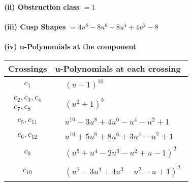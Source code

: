 \documentclass[1p]{elsarticle_modified}
\theoremstyle{definition}
\begin{document}
\flushleft \textbf{(ii) Obstruction class $= 1$}\\~\\
\flushleft \textbf{(iii) Cusp Shapes $= 4 u^8-8 u^6+8 u^4+4 u^2-8$}\\~\\
\newpage\renewcommand{\arraystretch}{1}
\flushleft \textbf{(iv) u-Polynomials at the component}\newline \\
\begin{tabular}{m{50pt}|m{274pt}}
Crossings & \hspace{64pt}u-Polynomials at each crossing \\
\hline $$\begin{aligned}c_{1}\end{aligned}$$&$\begin{aligned}
&(u-1)^{10}
\end{aligned}$\\
\hline $$\begin{aligned}c_{2},c_{3},c_{4}\\c_{7},c_{8}\end{aligned}$$&$\begin{aligned}
&(u^2+1)^5
\end{aligned}$\\
\hline $$\begin{aligned}c_{5},c_{11}\end{aligned}$$&$\begin{aligned}
&u^{10}-3 u^8+4 u^6- u^4- u^2+1
\end{aligned}$\\
\hline $$\begin{aligned}c_{6},c_{12}\end{aligned}$$&$\begin{aligned}
&u^{10}+5 u^8+8 u^6+3 u^4- u^2+1
\end{aligned}$\\
\hline $$\begin{aligned}c_{9}\end{aligned}$$&$\begin{aligned}
&(u^5+u^4-2 u^3- u^2+u-1)^2
\end{aligned}$\\
\hline $$\begin{aligned}c_{10}\end{aligned}$$&$\begin{aligned}
&(u^5-3 u^4+4 u^3- u^2- u+1)^2
\end{aligned}$\\
\hline
\end{tabular}\\~\\
\end{document}
